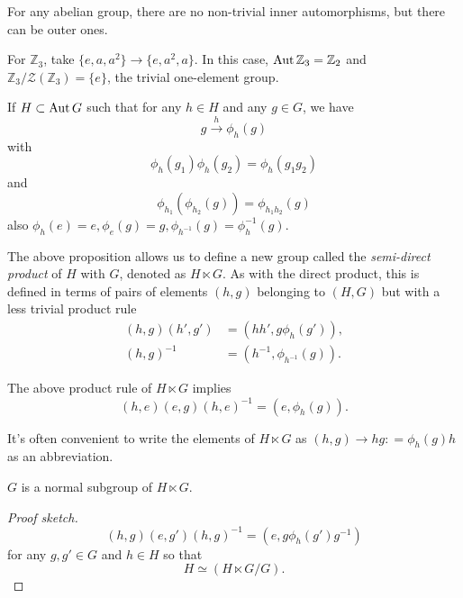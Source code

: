 \documentclass[a4paper,11pt]{article}
\begin{document}
	\begin{prop}
		For any abelian group, there are no non-trivial inner automorphisms, but there can be outer ones.
	\end{prop}

	\begin{ex}
		For $\mathbb{Z}_3$, take $\{e, a, a^2\} \to \{e, a^2, a\}$. In this case, $\operatorname{Aut} \mathbb{Z}_3 = \mathbb{Z}_2$ and $\mathbb{Z}_3 / \mathcal{Z}(\mathbb{Z}_3) = \{e\}$, the trivial one-element group. 
	\end{ex}

	\begin{lem}
		If $H \subset \operatorname{Aut} G$ such that for any $h\in H$ and any $g \in G$, we have
		\[
			g \xrightarrow{h} \phi_h (g)
		\]
		with 
		\[
			\phi_h (g_1) \phi_h (g_2) = \phi_h (g_1 g_2)
		\]
		and
		\[
			\phi_{h_1}(\phi _{h_2} (g)) = \phi _{h_1 h_2} (g)
		\]
		also $\phi_h (e) = e, \phi_e (g) = g, \phi_{h^{-1}} (g) = \phi_h ^{-1} (g)$. 
	\end{lem}

	\begin{defi}
		The above proposition allows us to define a new group called the \emph{semi-direct product} of $H$ with $G$, denoted as $H \ltimes G$. As with the direct product, this is defined in terms of pairs of elements $(h,g)$ belonging to $(H,G)$ but with a less trivial product rule
		\begin{align*}
			(h,g) (h',g') &= (hh', g \phi_h (g')),\\
			(h,g)^{-1} & = (h^{-1}, \phi _{h^{-1}} (g)).
		\end{align*}
	\end{defi}

	\begin{cor}
		The above product rule of $H \ltimes G$ implies
		\[
			(h,e)(e,g)(h,e)^{-1} = (e, \phi_h(g)).
		\]
		
	\end{cor}

	It's often convenient to write the elements of $H \ltimes G$ as $(h,g) \to hg : = \phi_h(g)h$ as an abbreviation.

	\begin{prop}
		$G$ is a normal subgroup of $H \ltimes G$.
	\end{prop}
	\begin{proof}[Proof sketch]
		\[
			(h,g)(e,g')(h,g)^{-1} = (e, g \phi_h(g') g^{-1})
		\]
		for any $g,g' \in G$ and $h\in H$ so that
		\[
			H \simeq (H \ltimes G / G).
		\]
	\end{proof}
\end{document}
